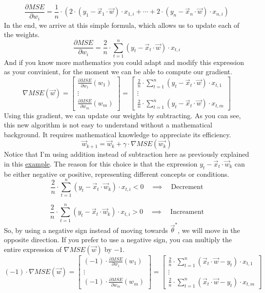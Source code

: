 \[
\frac{\partial MSE}{\partial w_i} = \frac{1}{n} \cdot (
2 \cdot (y_1 - \vec{x}_1 \cdot \vec{w}) \cdot x_{1, i} + \cdots +
2 \cdot (y_n - \vec{x}_n \cdot \vec{w}) \cdot x_{n, i})
\]
In the end, we arrive at this simple formula, which allows us to update each of the weights.
\[
\frac{\partial MSE}{\partial w_i} = \frac{2}{n} \cdot \sum_{t = 1}^n(y_t - \vec{x}_t \cdot \vec{w}) \cdot x_{t, i}
\]
And if you know more mathematics you could adapt and modify this expression as your convinient,
for the moment we can be able to compute our gradient.
\[
\nabla MSE(\vec{w}) =
\begin{bmatrix} \frac{\partial MSE}{\partial w_1}(w_1)
  \\ \vdots
  \\ \frac{\partial MSE}{\partial w_m}(w_m)
\end{bmatrix} =
\begin{bmatrix} \frac{2}{n} \cdot \sum_{t = 1}^n(y_t - \vec{x}_t \cdot \vec{w}) \cdot x_{t, 1}
  \\ \vdots
  \\ \frac{2}{n} \cdot \sum_{t = 1}^n(y_t - \vec{x}_t \cdot \vec{w}) \cdot x_{t, m}
\end{bmatrix} 
\]
Using this gradient, we can update our weights by subtracting. As you can see, this new algorithm is not easy
to understand without a mathematical background. It requires mathematical knowledge to appreciate its efficiency.
\[
\vec{w}_{k + 1} = \vec{w}_k + \gamma \cdot \nabla MSE(\vec{w_k})
\]
Notice that I'm using addition instead of subtraction here as previously explained in this
\hyperref[sec:diving_into_the_algorithm]{example}.
The reason for this choice is that the expression $y_t - \vec{x}_t \cdot \vec{w}_k$
can be either negative or positive, representing different concepts or conditions.
\[
\frac{2}{n} \cdot \sum_{t = 1}^n(y_t - \vec{x}_t \cdot \vec{w}_k) \cdot x_{t, i} < 0\quad \implies \quad
\text{Decrement}
\]

\[
\frac{2}{n} \cdot \sum_{t = 1}^n(y_t - \vec{x}_t \cdot \vec{w}_k) \cdot x_{t, i} > 0 \quad \implies \quad
\text{Increament}
\]
So, by using a negative sign instead of moving towards $\vec{\theta}^*$, we will move in the opposite direction.
If you prefer to use a negative sign, you can multiply the entire expression of $\nabla MSE(\vec{w})$ by $-1$.
\[
(-1) \cdot \nabla MSE(\vec{w}) = \begin{bmatrix} (-1) \cdot \frac{\partial MSE}{\partial w_1}(w_1)
  \\ \vdots
  \\ (-1) \cdot \frac{\partial MSE}{\partial w_m}(w_m)
\end{bmatrix} =
\begin{bmatrix} \frac{2}{n} \cdot \sum_{t = 1}^n(\vec{x}_t \cdot \vec{w} - y_t) \cdot x_{t, 1}
  \\ \vdots
  \\ \frac{2}{n} \cdot \sum_{t = 1}^n(\vec{x}_t \cdot \vec{w} - y_t) \cdot x_{t, m}
\end{bmatrix} 
\]

